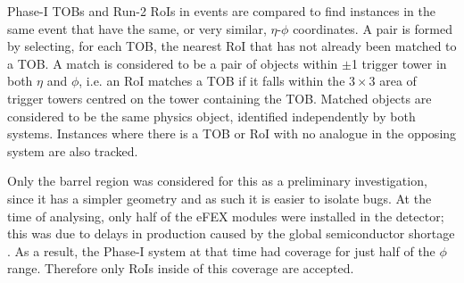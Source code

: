 
Phase-I \acp{TOB} and Run-2 \acp{RoI} in events are compared to find instances
in the same event that have the same, or very similar, $\eta$-$\phi$
coordinates. 
A pair is formed by selecting, for each \ac{TOB}, the nearest \ac{RoI} that
has not already been matched to a \ac{TOB}.
A match is considered to be a pair of objects within $\pm$1 trigger
tower in both $\eta$ and $\phi$, i.e. an \ac{RoI} matches a \ac{TOB} if it falls
within the $3\times3$ area of trigger towers centred on the tower containing the
\ac{TOB}. Matched objects are considered to be the same physics object,
identified independently by both systems. 
%
Instances where there is a \ac{TOB} or \ac{RoI} with no analogue in the opposing
system are also tracked.
%

Only the barrel region was considered for this as a preliminary investigation,
since it has a simpler geometry and as such it is easier to isolate bugs. At the
time of analysing, only half of the eFEX modules were installed in the detector;
this was due to delays in production caused by the global semiconductor shortage
\cite{Sweney2021}. As a result, the Phase-I system at that time had coverage for
just half of the $\phi$ range. Therefore only \acp{RoI} inside of this coverage
are accepted.
